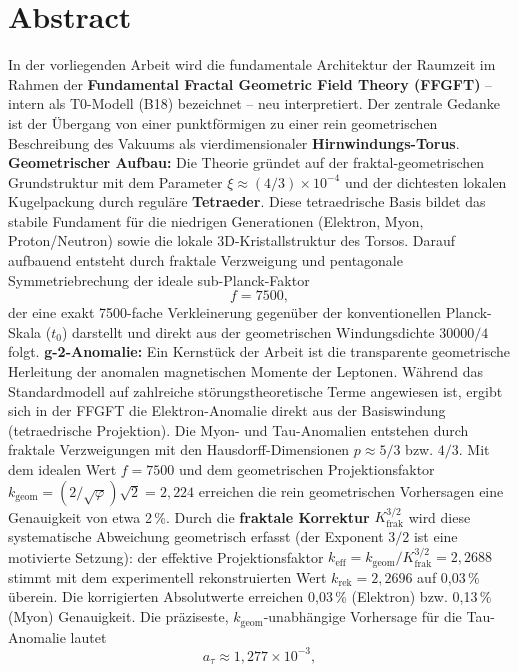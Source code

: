 \section*{Abstract}
		In der vorliegenden Arbeit wird die fundamentale Architektur der Raumzeit im Rahmen der \textbf{Fundamental Fractal Geometric Field Theory (FFGFT)} – intern als T0-Modell (B18) bezeichnet – neu interpretiert. Der zentrale Gedanke ist der Übergang von einer punktförmigen zu einer rein geometrischen Beschreibung des Vakuums als vierdimensionaler \textbf{Hirnwindungs-Torus}.
		\textbf{Geometrischer Aufbau:} Die Theorie gründet auf der fraktal-geometrischen Grundstruktur mit dem Parameter $\xi \approx (4/3)\times 10^{-4}$ und der dichtesten lokalen Kugelpackung durch reguläre \textbf{Tetraeder}. Diese tetraedrische Basis bildet das stabile Fundament für die niedrigen Generationen (Elektron, Myon, Proton/Neutron) sowie die lokale 3D-Kristallstruktur des Torsos. Darauf aufbauend entsteht durch fraktale Verzweigung und pentagonale Symmetriebrechung der ideale sub-Planck-Faktor
		\begin{equation*}
			f = 7500,
		\end{equation*}
		der eine exakt 7500-fache Verkleinerung gegenüber der konventionellen Planck-Skala ($t_0$) darstellt und direkt aus der geometrischen Windungsdichte $30000/4$ folgt.
		\textbf{g-2-Anomalie:} Ein Kernstück der Arbeit ist die transparente geometrische Herleitung der anomalen magnetischen Momente der Leptonen. Während das Standardmodell auf zahlreiche störungstheoretische Terme angewiesen ist, ergibt sich in der FFGFT die Elektron-Anomalie direkt aus der Basiswindung (tetraedrische Projektion). Die Myon- und Tau-Anomalien entstehen durch fraktale Verzweigungen mit den Hausdorff-Dimensionen $p \approx 5/3$ bzw. $4/3$. Mit dem idealen Wert $f = 7500$ und dem geometrischen Projektionsfaktor $k_\text{geom} = (2/\sqrt{\varphi})\sqrt{2} = 2{,}224$ erreichen die rein geometrischen Vorhersagen eine Genauigkeit von etwa 2\,\%. Durch die \textbf{fraktale Korrektur} $K_\text{frak}^{3/2}$ wird diese systematische Abweichung geometrisch erfasst (der Exponent $3/2$ ist eine motivierte Setzung): der effektive Projektionsfaktor $k_\text{eff} = k_\text{geom} / K_\text{frak}^{3/2} = 2{,}2688$ stimmt mit dem experimentell rekonstruierten Wert $k_\text{rek} = 2{,}2696$ auf 0{,}03\,\% überein. Die korrigierten Absolutwerte erreichen 0{,}03\,\% (Elektron) bzw. 0{,}13\,\% (Myon) Genauigkeit. Die präziseste, $k_\text{geom}$-unabhängige Vorhersage für die Tau-Anomalie lautet
		\begin{equation*}
			a_\tau \approx 1{,}277 \times 10^{-3},
		\end{equation*}
